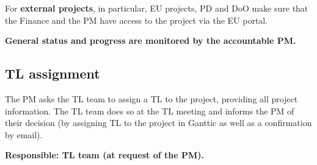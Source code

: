 For \textbf{external projects}, in particular, EU projects, PD and DoO make sure that the Finance and the PM have access to the project via the EU portal.

\textbf{General status and progress are monitored by the accountable PM.}

\subsection{TL assignment}
\label{sec:init:tl-assign}
The PM asks the TL team to assign a TL to the project, providing all project information. The TL team does so at the TL
meeting and informs the PM of their decision (by assigning TL to the project in Ganttic as well as a confirmation by
email). %

\textbf{Responsible: TL team (at request of the PM).}

